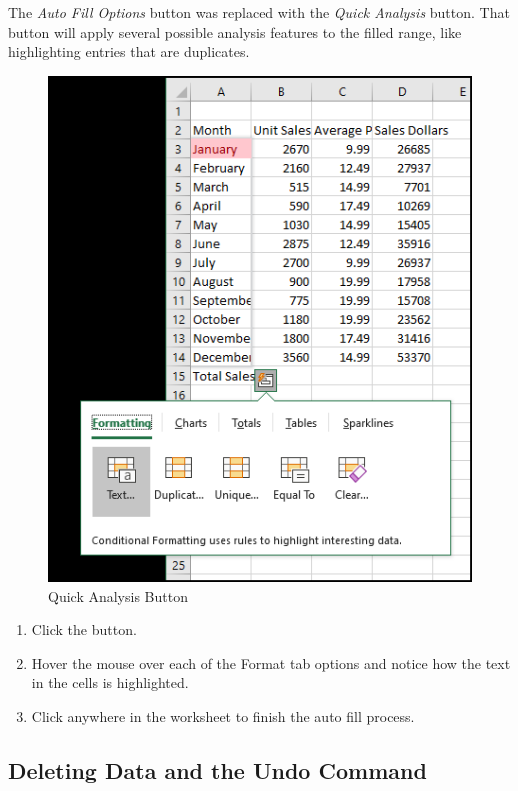  The \textit{Auto Fill Options} button was replaced with the \textit{Quick Analysis} button. That button will apply several possible analysis features to the filled range, like highlighting entries that are duplicates.

\begin{figure}[H]
	\centering
	\includegraphics[width=\maxwidth{.95\linewidth}]{gfx/ch01_fig20a}
	\caption{Quick Analysis Button}
	\label{01:fig20a}
\end{figure}

\begin{enumerate}
	\item Click the  button.
	\item Hover the mouse over each of the Format tab options and notice how the text in the cells is highlighted.
	\item Click anywhere in the worksheet to finish the auto fill process.
\end{enumerate}

\subsection{Deleting Data and the Undo Command}

